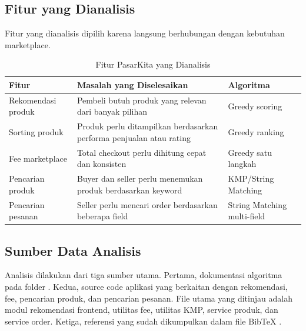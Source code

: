 \subsection{Fitur yang Dianalisis}

Fitur yang dianalisis dipilih karena langsung berhubungan dengan kebutuhan marketplace.

\begin{table}[htbp]
    \caption{Fitur PasarKita yang Dianalisis}
    \label{tab:fitur-dianalisis}
    \small
    \begin{tabularx}{\textwidth}{@{} >{\raggedright\arraybackslash}X >{\raggedright\arraybackslash}X >{\raggedright\arraybackslash}X @{}}
    \toprule
    \textbf{Fitur} & \textbf{Masalah yang Diselesaikan} & \textbf{Algoritma} \\
    \midrule
    Rekomendasi produk & Pembeli butuh produk yang relevan dari banyak pilihan & Greedy scoring \\
    Sorting produk & Produk perlu ditampilkan berdasarkan performa penjualan atau rating & Greedy ranking \\
    Fee marketplace & Total checkout perlu dihitung cepat dan konsisten & Greedy satu langkah \\
    Pencarian produk & Buyer dan seller perlu menemukan produk berdasarkan keyword & KMP/String Matching \\
    Pencarian pesanan & Seller perlu mencari order berdasarkan beberapa field & String Matching multi-field \\
    \bottomrule
    \end{tabularx}
\end{table}

\subsection{Sumber Data Analisis}

Analisis dilakukan dari tiga sumber utama. Pertama, dokumentasi algoritma pada folder . Kedua, source code aplikasi yang berkaitan dengan rekomendasi, fee, pencarian produk, dan pencarian pesanan. File utama yang ditinjau adalah modul rekomendasi frontend, utilitas fee, utilitas KMP, service produk, dan service order. Ketiga, referensi yang sudah dikumpulkan dalam file BibTeX .
